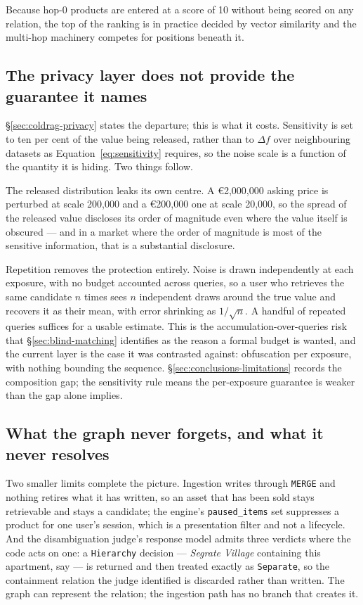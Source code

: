 Because hop-0 products are entered at a score of 10 without being scored on any relation, the top of the ranking is in practice decided by vector similarity and the multi-hop machinery competes for positions beneath it.

\subsection{The privacy layer does not provide the guarantee it names}

\S\ref{sec:coldrag-privacy} states the departure; this is what it costs. Sensitivity is set to ten per cent of the value being released, rather than to $\Delta f$ over neighbouring datasets as Equation~\ref{eq:sensitivity} requires, so the noise scale is a function of the quantity it is hiding. Two things follow.

The released distribution leaks its own centre. A €2{,}000{,}000 asking price is perturbed at scale 200{,}000 and a €200{,}000 one at scale 20{,}000, so the spread of the released value discloses its order of magnitude even where the value itself is obscured --- and in a market where the order of magnitude is most of the sensitive information, that is a substantial disclosure.

Repetition removes the protection entirely. Noise is drawn independently at each exposure, with no budget accounted across queries, so a user who retrieves the same candidate $n$ times sees $n$ independent draws around the true value and recovers it as their mean, with error shrinking as $1/\sqrt{n}$. A handful of repeated queries suffices for a usable estimate. This is the accumulation-over-queries risk that \S\ref{sec:blind-matching} identifies as the reason a formal budget is wanted, and the current layer is the case it was contrasted against: obfuscation per exposure, with nothing bounding the sequence. \S\ref{sec:conclusions-limitations} records the composition gap; the sensitivity rule means the per-exposure guarantee is weaker than the gap alone implies.

\subsection{What the graph never forgets, and what it never resolves}

Two smaller limits complete the picture. Ingestion writes through \texttt{MERGE} and nothing retires what it has written, so an asset that has been sold stays retrievable and stays a candidate; the engine's \texttt{paused\_items} set suppresses a product for one user's session, which is a presentation filter and not a lifecycle. And the disambiguation judge's response model admits three verdicts where the code acts on one: a \texttt{Hierarchy} decision --- \emph{Segrate Village} containing this apartment, say --- is returned and then treated exactly as \texttt{Separate}, so the containment relation the judge identified is discarded rather than written. The graph can represent the relation; the ingestion path has no branch that creates it.

